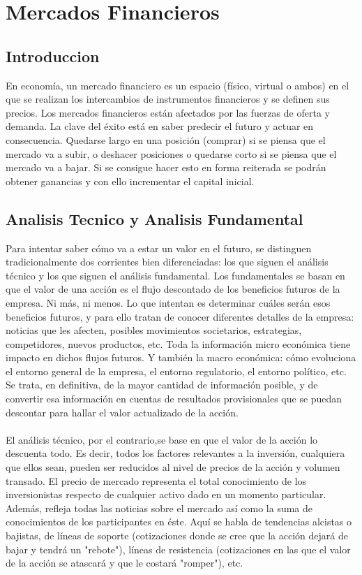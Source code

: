 \chapter{Mercados Financieros}

\section{Introduccion}
En economía, un mercado financiero es un espacio (físico, virtual o ambos) en el que se realizan los intercambios de instrumentos financieros y se definen sus precios. Los mercados financieros están afectados por las fuerzas de oferta y demanda. La clave del éxito está en saber predecir el futuro y actuar en consecuencia. Quedarse largo en una posición (comprar) si se piensa que el mercado va a subir, o deshacer posiciones o quedarse corto si se piensa que el mercado va a bajar. Si se consigue hacer esto en forma reiterada se podrán obtener ganancias y con ello incrementar el capital inicial.

\section{Analisis Tecnico y Analisis Fundamental}
Para intentar saber cómo va a estar un valor en el futuro, se distinguen tradicionalmente dos corrientes bien diferenciadas: los que siguen el análisis técnico y los que siguen el análisis fundamental. Los fundamentales se basan en que el valor de una acción es el flujo descontado de los beneficios futuros de la empresa. Ni más, ni menos. Lo que intentan es determinar cuáles serán esos beneficios futuros, y para ello tratan de conocer diferentes detalles de la empresa: noticias que les afecten, posibles movimientos societarios, estrategias, competidores, nuevos productos, etc. Toda la información micro económica tiene impacto en dichos flujos futuros. Y también la macro económica: cómo evoluciona el entorno general de la empresa, el entorno regulatorio, el entorno político, etc. Se trata, en definitiva, de la mayor cantidad de información posible, y de convertir esa información en cuentas de resultados provisionales que se puedan descontar para hallar el valor actualizado de la acción. 
\\\\

El análisis técnico, por el contrario,se base en que el valor de la acción lo descuenta todo. Es decir, todos los factores relevantes a la inversión, cualquiera que ellos sean, pueden ser reducidos al nivel de precios de la acción y volumen transado. El precio de mercado representa el total conocimiento de los inversionistas respecto de cualquier activo dado en un momento particular. Además, refleja todas las noticias sobre el mercado así como la suma de conocimientos de los participantes en éste.  Aquí se habla de tendencias alcistas o bajistas, de líneas de soporte (cotizaciones donde se cree que la acción dejará de bajar y tendrá un "rebote"), líneas de resistencia (cotizaciones en las que el valor de la acción se atascará y que le costará "romper"), etc. 
\\\\

